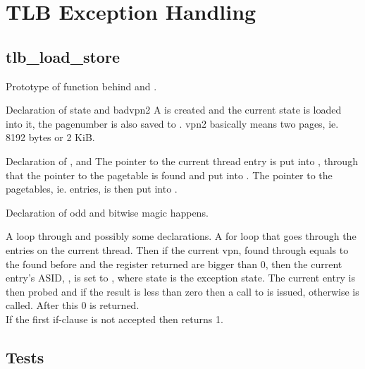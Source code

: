 %
%
%

\section{TLB Exception Handling}
\subsection{tlb\_load\_store}
    {Prototype of function behind  and
                          .}

    {Declaration of state and badvpn2}
A  is created and the current state is loaded
into it, the pagenumber is also saved to . vpn2
basically means two pages, ie. 8192 bytes or 2 KiB.


    {Declaration of ,  and }
The pointer to the current thread entry is put into , through
that the pointer to the pagetable is found and put into . The
pointer to the pagetables, ie. entries, is then put into .

    {Declaration of odd and bitwise magic happens.}

    {A loop through  and possibly some declarations.}
A for loop that goes through the entries on the current thread. Then if the
current vpn, found through  equals to the 
found before and the register returned are bigger than 0, then the current entry's ASID,
, is set to , where state is the
exception state. The current entry is then probed and if the result is less than
zero then a call to  is issued, otherwise
 is called. After this 0 is returned. \\
If the first if-clause is not accepted then 
returns 1.
\subsection{Tests}


